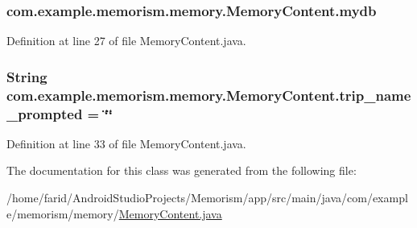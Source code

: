 \subsubsection[{\texorpdfstring{mydb}{mydb}}]{ com.\+example.\+memorism.\+memory.\+Memory\+Content.\+mydb\hspace{0.3cm}{\ttfamily [static]}}\hypertarget{classcom_1_1example_1_1memorism_1_1memory_1_1_memory_content_ae0b89ca96c4bb6c8544e45feebdee2df}{}\label{classcom_1_1example_1_1memorism_1_1memory_1_1_memory_content_ae0b89ca96c4bb6c8544e45feebdee2df}


Definition at line 27 of file Memory\+Content.\+java.

\subsubsection[{\texorpdfstring{trip\+\_\+name\+\_\+prompted}{trip_name_prompted}}]{\setlength{\rightskip}{0pt plus 5cm}String com.\+example.\+memorism.\+memory.\+Memory\+Content.\+trip\+\_\+name\+\_\+prompted = \char`\"{}\char`\"{}\hspace{0.3cm}{\ttfamily [static]}}\hypertarget{classcom_1_1example_1_1memorism_1_1memory_1_1_memory_content_aaa05c280eab2d10c9902b19a03825952}{}\label{classcom_1_1example_1_1memorism_1_1memory_1_1_memory_content_aaa05c280eab2d10c9902b19a03825952}


Definition at line 33 of file Memory\+Content.\+java.



The documentation for this class was generated from the following file\+:\begin{DoxyCompactItemize}
\item 
/home/farid/\+Android\+Studio\+Projects/\+Memorism/app/src/main/java/com/example/memorism/memory/\hyperlink{_memory_content_8java}{Memory\+Content.\+java}\end{DoxyCompactItemize}
